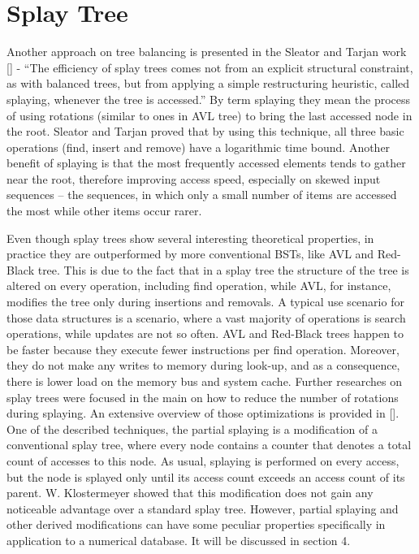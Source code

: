 \section{Splay Tree}

Another approach on tree balancing is presented in the Sleator and Tarjan work [] - “The efficiency of splay trees comes not from an explicit structural constraint, as with balanced trees, but from applying a simple restructuring heuristic, called splaying, whenever the tree is accessed.” By term splaying they mean the process of using rotations (similar to ones in AVL tree) to bring the last accessed node in the root. Sleator and Tarjan proved that by using this technique, all three basic operations (find, insert and remove) have a logarithmic time bound. Another benefit of splaying is that the most frequently accessed elements tends to gather near the root, therefore improving access speed, especially on skewed input sequences – the sequences, in which only a small number of items are accessed the most while other items occur rarer.

Even though splay trees show several interesting theoretical properties, in practice they are outperformed by more conventional BSTs, like AVL and Red-Black tree. This is due to the fact that in a splay tree the structure of the tree is altered on every operation, including find operation, while AVL, for instance, modifies the tree only during insertions and removals. A typical use scenario for those data structures is a scenario, where a vast majority of operations is search operations, while updates are not so often. AVL and Red-Black trees happen to be faster because they execute fewer instructions per find operation. Moreover, they do not make any writes to memory during look-up, and as a consequence, there is lower load on the memory bus and system cache. Further researches on splay trees were focused in the main on how to reduce the number of rotations during splaying. An extensive overview of those optimizations is provided in []. One of the described techniques, the partial splaying is a modification of a conventional splay tree, where every node contains a counter that denotes a total count of accesses to this node. As usual, splaying is performed on every access, but the node is splayed only until its access count exceeds an access count of its parent. W. Klostermeyer showed that this modification does not gain any noticeable advantage over a standard splay tree. However, partial splaying and other derived modifications can have some peculiar properties specifically in application to a numerical database. It will be discussed in section 4.

